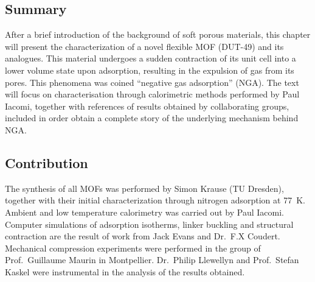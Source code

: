 \subsection*{Summary}

After a brief introduction of the background of soft porous 
materials, this chapter will present the characterization of a novel
flexible MOF (DUT-49) and its analogues. This material undergoes
a sudden contraction of its unit cell into a lower volume state
upon adsorption, resulting in the expulsion of gas from its pores.
This phenomena was coined ``negative gas adsorption'' (NGA).
The text will focus on characterisation through calorimetric methods
performed by Paul Iacomi, together with references
of results obtained by collaborating groups, included in order
obtain a complete story of the underlying mechanism behind NGA.

\subsection*{Contribution}

The synthesis of all MOFs was performed by Simon Krause
(TU Dresden), together with their initial characterization through 
nitrogen adsorption at \SI{77}{\kelvin}.
Ambient and low temperature calorimetry was carried out by 
Paul Iacomi. Computer simulations of adsorption isotherms, 
linker buckling and structural contraction
are the result of work from Jack Evans and Dr.\ F.X Coudert.
Mechanical compression experiments were performed in 
the group of Prof.\ Guillaume Maurin in Montpellier. 
Dr.\ Philip Llewellyn and Prof.\ Stefan Kaskel were 
instrumental in the analysis of the results obtained.
